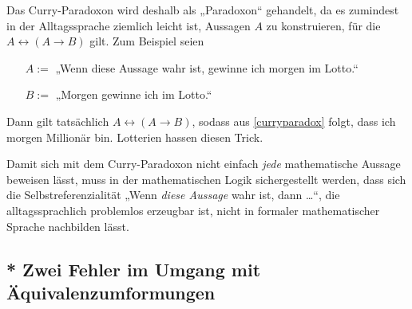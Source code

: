 \begin{bem}
    Das Curry-Paradoxon wird deshalb als „Paradoxon“ gehandelt, da es zumindest in der Alltagssprache ziemlich leicht ist, Aussagen $A$ zu konstruieren, für die $A\leftrightarrow (A\to B)$ gilt. Zum Beispiel seien
    \begin{itemize}[labelindent=1.5em, leftmargin=!, labelwidth=]
        \item[$A:=$] „Wenn diese Aussage wahr ist, gewinne ich morgen im Lotto.“
        \item[$B:=$] „Morgen gewinne ich im Lotto.“
    \end{itemize}
    Dann gilt tatsächlich $A\leftrightarrow (A\to B)$, sodass aus \cref{curryparadox} folgt, dass ich morgen Millionär bin. Lotterien hassen diesen Trick.
    
    Damit sich mit dem Curry-Paradoxon nicht einfach \emph{jede} mathematische Aussage beweisen lässt, muss in der mathematischen Logik sichergestellt werden, dass sich die Selbstreferenzialität „Wenn \emph{diese Aussage} wahr ist, dann \dots“, die alltagssprachlich problemlos erzeugbar ist, nicht in formaler mathematischer Sprache nachbilden lässt.
\end{bem}





\subsection*{* Zwei Fehler im Umgang mit Äquivalenzumformungen}


